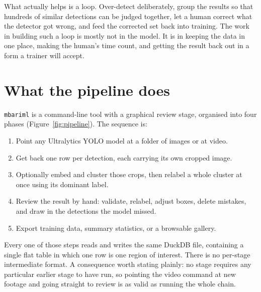 \documentclass[10pt,letterpaper]{article}
\newcommand{\code}[1]{\texttt{\small #1}}
\begin{document}
What actually helps is a loop. Over-detect deliberately, group the results so
that hundreds of similar detections can be judged together, let a human correct
what the detector got wrong, and feed the corrected set back into training. The
work in building such a loop is mostly not in the model. It is in keeping the
data in one place, making the human's time count, and getting the result back
out in a form a trainer will accept.

\section{What the pipeline does}

\code{mbariml} is a command-line tool with a graphical review stage, organised
into four phases (Figure~\ref{fig:pipeline}). The sequence is:

\begin{enumerate}\itemsep2pt
\item Point any Ultralytics YOLO model at a folder of images or at video.
\item Get back one row per detection, each carrying its own cropped image.
\item Optionally embed and cluster those crops, then relabel a whole cluster at
      once using its dominant label.
\item Review the result by hand: validate, relabel, adjust boxes, delete
      mistakes, and draw in the detections the model missed.
\item Export training data, summary statistics, or a browsable gallery.
\end{enumerate}

Every one of those steps reads and writes the same DuckDB file, containing a
single flat table in which one row is one region of interest. There is no
per-stage intermediate format. A consequence worth stating plainly: no stage
requires any particular earlier stage to have run, so pointing the video command
at new footage and going straight to review is as valid as running the whole
chain.
\end{document}
